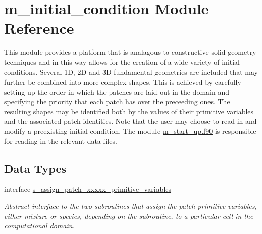 \hypertarget{namespacem__initial__condition}{}\section{m\+\_\+initial\+\_\+condition Module Reference}
\label{namespacem__initial__condition}


This module provides a platform that is analagous to constructive solid geometry techniques and in this way allows for the creation of a wide variety of initial conditions. Several 1D, 2D and 3D fundamental geometries are included that may further be combined into more complex shapes. This is achieved by carefully setting up the order in which the patches are laid out in the domain and specifying the priority that each patch has over the preceeding ones. The resulting shapes may be identified both by the values of their primitive variables and the associated patch identities. Note that the user may choose to read in and modify a preexisting initial condition. The module \hyperlink{m__start__up_8f90}{m\+\_\+start\+\_\+up.\+f90} is responsible for reading in the relevant data files.  


\subsection*{Data Types}
\begin{DoxyCompactItemize}
\item 
interface \hyperlink{interfacem__initial__condition_1_1s__assign__patch__xxxxx__primitive__variables}{s\+\_\+assign\+\_\+patch\+\_\+xxxxx\+\_\+primitive\+\_\+variables}
\begin{DoxyCompactList}\small\item\em Abstract interface to the two subroutines that assign the patch primitive variables, either mixture or species, depending on the subroutine, to a particular cell in the computational domain. \end{DoxyCompactList}\end{DoxyCompactItemize}
